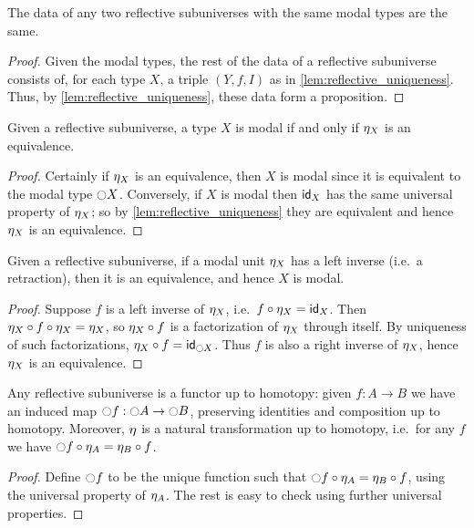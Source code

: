 \begin{thm}\label{thm:subuniverse-rs}
The data of any two reflective subuniverses with the same modal types are the same.
\end{thm}
\begin{proof}
  Given the modal types, the rest of the data of a reflective subuniverse consists of, for each type $X$, a triple $(Y,f,I)$ as in \cref{lem:reflective_uniqueness}.
  Thus, by \cref{lem:reflective_uniqueness}, these data form a proposition.
\end{proof}

\begin{lem}\label{lem:subuniv-modal}
  Given a reflective subuniverse, a type $X$ is modal if and only if $\modalunit[X]$ is an equivalence.
\end{lem}
\begin{proof}
  Certainly if $\modalunit[X]$ is an equivalence, then $X$ is modal since it is equivalent to the modal type $\modal X$.
  Conversely, if $X$ is modal then $\idfunc[X]$ has the same universal property of $\modalunit[X]$; so by \cref{lem:reflective_uniqueness} they are equivalent and hence $\modalunit[X]$ is an equivalence.
\end{proof}

\begin{lem}\label{thm:modalunit-retract-equiv}
  Given a reflective subuniverse, if a modal unit $\modalunit[X]$ has a left inverse (i.e.\ a retraction), then it is an equivalence, and hence $X$ is modal.
\end{lem}
\begin{proof}
  Suppose $f$ is a left inverse of $\modalunit[X]$, i.e.\ $f\circ \modalunit[X] = \idfunc[X]$.
  Then $\modalunit[X]\circ f\circ \modalunit[X] = \modalunit[X]$, so $\modalunit[X]\circ f$ is a factorization of $\modalunit[X]$ through itself.
  By uniqueness of such factorizations, $\modalunit[X]\circ f = \idfunc[\modal X]$.
  Thus $f$ is also a right inverse of $\modalunit[X]$, hence $\modalunit[X]$ is an equivalence.
\end{proof}

\begin{lem}
  Any reflective subuniverse is a functor up to homotopy: given $f:A\to B$ we have an induced map $\modal f : \modal A \to \modal B$, preserving identities and composition up to homotopy.
  Moreover, $\modalunit$ is a natural transformation up to homotopy, i.e.\ for any $f$ we have $\modal f \circ \modalunit[A] = \modalunit[B] \circ f$.
\end{lem}
\begin{proof}
  Define $\modal f$ to be the unique function such that $\modal f \circ \modalunit[A] = \modalunit[B] \circ f$, using the universal property of $\modalunit[A]$.
  The rest is easy to check using further universal properties.
\end{proof}

